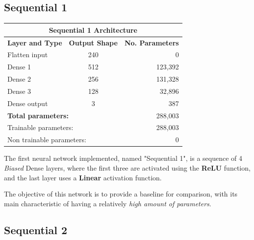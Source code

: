 \documentclass[13pt]{article}
\begin{document}
\subsection{Sequential 1}
\begin{center}
    \begin{tabular}{| l | c | r |}
        \hline
        \multicolumn{3}{|c|}{\textbf{Sequential 1 Architecture}} \\
        \hline
        \hline
        \textbf{Layer and Type} & \textbf{Output Shape} & \textbf{No. Parameters} \\
        \hline
        Flatten input & 240 & 0 \\
        Dense 1 & 512 & 123,392 \\
        Dense 2 & 256 & 131,328 \\
        Dense 3 & 128 & 32,896 \\
        Dense output & 3 & 387 \\
        \hline
        \multicolumn{2}{|l|}{\textbf{Total parameters:}} & 288,003 \\
        \multicolumn{2}{|l|}{Trainable parameters:} & 288,003 \\
        \multicolumn{2}{|l|}{Non trainable parameters:} & 0 \\
        \hline
    \end{tabular}
\end{center}

The first neural network implemented, named "Sequential 1", is a sequence of 4 \textit{Biased} Dense layers, where the first three are activated using the \textbf{ReLU} function, and the last layer uses a \textbf{Linear} activation function.

The objective of this network is to provide a baseline for comparison, with its main characteristic of having a relatively \textit{high amount of parameters}.

\subsection{Sequential 2}
\end{document}
